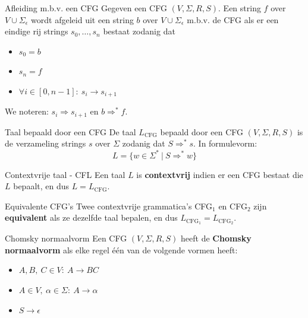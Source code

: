 \begin{theo}{Afleiding m.b.v. een CFG}
    Gegeven een CFG $(V, \Sigma, R, S)$. Een string $f$ over $V \cup \Sigma_{\epsilon}$ wordt afgeleid uit een string $b$ over $V \cup \Sigma_{\epsilon}$ 
    m$.$b$.$v$.$ de CFG als er een eindige rij strings $s_0, \ldots, s_n$ bestaat zodanig dat
    \begin{itemize}
        \item $s_0 = b$
        \item $s_n = f$
        \item $\forall i \in [0,n-1]: \ s_i \to s_{i+1}$
    \end{itemize} 
    We noteren: $s_i \Rightarrow s_{i+1}$ en $b \Rightarrow^* f$. 
    \vspace{-0.1cm}
\end{theo}

\begin{theo}{Taal bepaald door een CFG}
    De taal $L_{\text{CFG}}$ bepaald door een CFG $(V, \Sigma, R, S)$ is de verzameling strings $s$ over $\Sigma$ zodanig dat $S \Rightarrow^* s$. In formulevorm:
    \begin{equation*}
        L = \{ w \in \Sigma^* \ | \ S \Rightarrow^* w \}
    \end{equation*}
    \vspace{-0.5cm}
\end{theo}

\begin{theo}{Contextvrije taal - CFL}
    Een taal $L$ is \textbf{contextvrij} indien er een CFG bestaat die $L$ bepaalt, en dus $L = L_{\text{CFG}}$.
\end{theo}

\begin{theo}{Equivalente CFG's}
    Twee contextvrije grammatica's CFG$_1$ en CFG$_2$ zijn \textbf{equivalent} als ze dezelfde taal bepalen, en dus $L_{\text{CFG}_1} = L_{\text{CFG}_2}$.
\end{theo}

\begin{theo}{Chomsky normaalvorm}
    Een CFG $(V, \Sigma, R, S)$ heeft de \textbf{Chomsky normaalvorm} als elke regel één van de volgende vormen heeft:
    \begin{itemize}
        \item $A,B, \ C \in V: \ A \to BC$
        \item $A \in V, \ \alpha \in \Sigma: \ A \to \alpha$ 
        \item $S \to \epsilon$
    \end{itemize}
    \vspace{-0.3cm}
\end{theo}

